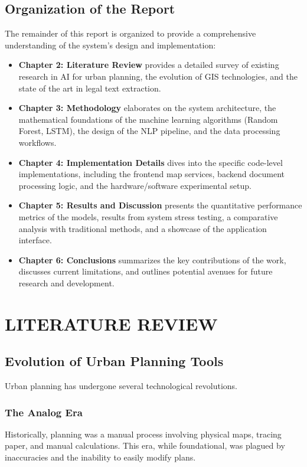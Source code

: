 \documentclass[12pt,a4paper]{report}
\begin{document}
\section{Organization of the Report}
The remainder of this report is organized to provide a comprehensive understanding of the system's design and implementation:
\begin{itemize}
    \item \textbf{Chapter 2: Literature Review} provides a detailed survey of existing research in AI for urban planning, the evolution of GIS technologies, and the state of the art in legal text extraction.
    \item \textbf{Chapter 3: Methodology} elaborates on the system architecture, the mathematical foundations of the machine learning algorithms (Random Forest, LSTM), the design of the NLP pipeline, and the data processing workflows.
    \item \textbf{Chapter 4: Implementation Details} dives into the specific code-level implementations, including the frontend map services, backend document processing logic, and the hardware/software experimental setup.
    \item \textbf{Chapter 5: Results and Discussion} presents the quantitative performance metrics of the models, results from system stress testing, a comparative analysis with traditional methods, and a showcase of the application interface.
    \item \textbf{Chapter 6: Conclusions} summarizes the key contributions of the work, discusses current limitations, and outlines potential avenues for future research and development.
\end{itemize}

\chapter{LITERATURE REVIEW}

\section{Evolution of Urban Planning Tools}
Urban planning has undergone several technological revolutions. 
\subsection{The Analog Era}
Historically, planning was a manual process involving physical maps, tracing paper, and manual calculations. This era, while foundational, was plagued by inaccuracies and the inability to easily modify plans.
\end{document}
